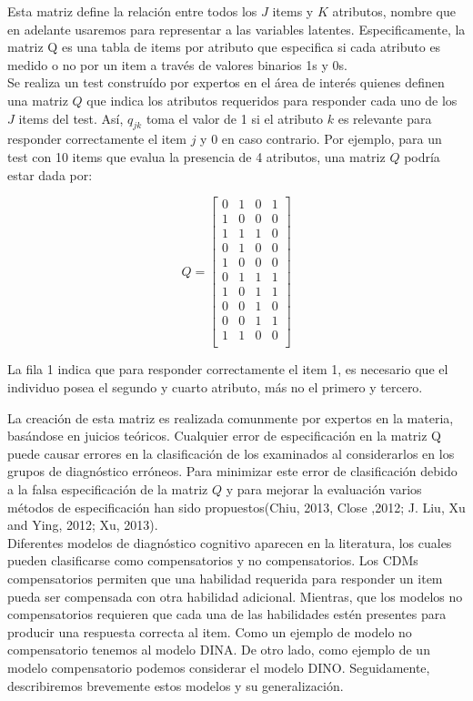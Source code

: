 		Esta matriz define la relaci\'{o}n entre todos los $J$ items y $K$ atributos, nombre que en adelante usaremos para representar a las variables latentes. Especificamente, la matriz Q es una tabla de items por atributo que especifica si cada atributo es medido o no por un item a trav\'{e}s de valores binarios 1s y 0s.\\
		Se realiza un test constru\'{i}do por expertos en el \'{a}rea de inter\'{e}s quienes definen una matriz $Q$ que indica los atributos requeridos para responder cada uno de los $J$ items del test. As\'{i}, ${q}_{ jk }$ toma el valor de 1 si el atributo $k$ es relevante para responder correctamente el item $j$ y 0 en caso contrario.
		Por ejemplo, para un test con 10 items que evalua la presencia de 4 atributos, una matriz $Q$ podr\'{i}a estar dada por:
		
		\begin{equation} 
			Q = \left[ \begin{array}{cccc} 
				0 & 1 & 0 & 1 \\  
				1 & 0 & 0 & 0 \\
				1 & 1 & 1 & 0 \\  
				0 & 1 & 0 & 0 \\
				1 & 0 & 0 & 0 \\  
				0 & 1 & 1 & 1 \\
				1 & 0 & 1 & 1 \\  
				0 & 0 & 1 & 0 \\
				0 & 0 & 1 & 1 \\  
				1 & 1 & 0 & 0 \\
			\end{array} \right] \label{2.23}
		\end{equation}
		
		La fila 1 indica que para responder correctamente el item 1, es necesario que el individuo posea el segundo y cuarto atributo, m\'{a}s no el primero y tercero.
		
		La creaci\'{o}n de esta matriz es realizada comunmente por expertos en la materia, bas\'{a}ndose en juicios te\'{o}ricos. Cualquier error de especificaci\'{o}n en la matriz Q puede causar errores en la clasificaci\'{o}n de los examinados al considerarlos en los grupos de diagn\'{o}stico err\'{o}neos. Para minimizar este error de clasificaci\'{o}n debido a la falsa especificaci\'{o}n de la matriz $Q$ y para mejorar la evaluaci\'{o}n varios m\'{e}todos de especificaci\'{o}n han sido propuestos(Chiu, 2013, Close ,2012; J. Liu, Xu and Ying, 2012; Xu, 2013).\\
		Diferentes modelos de diagn\'{o}stico cognitivo aparecen en la literatura, los cuales pueden clasificarse como compensatorios y no compensatorios. Los CDMs compensatorios permiten que una habilidad requerida para responder un item pueda ser compensada con otra habilidad adicional. Mientras, que los modelos no compensatorios requieren que cada una de las habilidades est\'{e}n presentes para producir una respuesta correcta al item.
		Como un ejemplo de modelo no compensatorio tenemos al modelo DINA. De otro lado, como ejemplo de un modelo compensatorio podemos considerar el modelo DINO.
		Seguidamente, describiremos brevemente estos modelos y su generalizaci\'{o}n.
		
